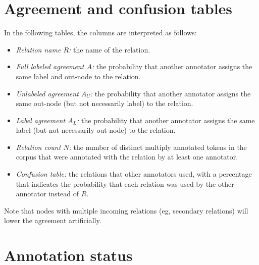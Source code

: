 \documentclass[11pt]{report}
\def\rel#1{\textsf{#1\index{#1}}}
\begin{document}
	\renewenvironment{overview}[1]{\begin{center}\def\mycaption{#1}\begin{longtable}{|p{120mm}|}\hline}{\\ \hline\end{longtable}\nopagebreak\medskip\nopagebreak\par\nopagebreak{The relations matching \rel{\small\mycaption}.}\end{center}\bigskip}

	

	\chapter{Agreement and confusion tables}

	In the following tables, the columns are interpreted as follows:
	\begin{itemize}
		\item \textit{Relation name $R$:} the name of the relation.
		\item \textit{Full labeled agreement $A$:} the probability that
			another annotator assigns the same label and out-node to
			the relation.
		\item \textit{Unlabeled agreement $A_U$:} the probability that
			another annotator assigns the same out-node (but not
			necessarily label) to the relation.
		\item \textit{Label agreement $A_L$:} the probability that
			another annotator assigns the same label (but not
			necessarily out-node) to
			the relation.
		\item \textit{Relation count $N$:} the number of distinct
			multiply annotated tokens in the corpus that were
			annotated with the relation by at least one annotator.
		\item \textit{Confusion table:} the relations that other
			annotators used, with a percentage that indicates the
			probability that each relation was used by the other annotator 
			instead of $R$.
	\end{itemize}
	Note that nodes with multiple incoming relations (eg, secondary
	relations) will lower the agreement artificially.

	
	
	
	
	
	
	

	\chapter{Annotation status}

	

	\printindex
\end{document}
